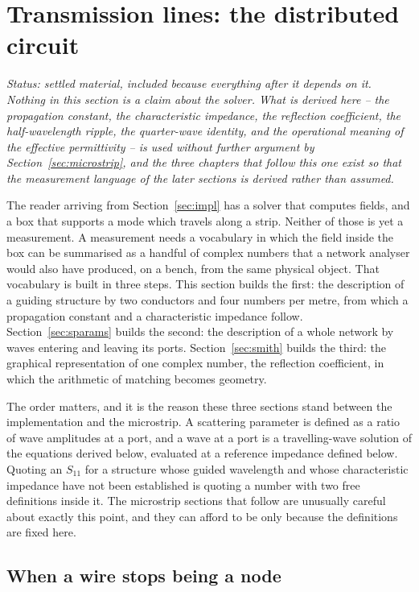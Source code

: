 \section{Transmission lines: the distributed circuit}
\label{sec:tline}

\noindent\emph{Status: settled material, included because everything after it depends on it. Nothing in this
section is a claim about the solver. What is derived here -- the propagation constant, the characteristic
impedance, the reflection coefficient, the half-wavelength ripple, the quarter-wave identity, and the
operational meaning of the effective permittivity -- is used without further argument by
Section~\ref{sec:microstrip}, and the three chapters that follow this one exist so that the measurement
language of the later sections is derived rather than assumed.}

The reader arriving from Section~\ref{sec:impl} has a solver that computes fields, and a box that supports a
mode which travels along a strip. Neither of those is yet a measurement. A measurement needs a vocabulary in
which the field inside the box can be summarised as a handful of complex numbers that a network analyser would
also have produced, on a bench, from the same physical object. That vocabulary is built in three steps. This
section builds the first: the description of a guiding structure by two conductors and four numbers per metre,
from which a propagation constant and a characteristic impedance follow. Section~\ref{sec:sparams} builds the
second: the description of a whole network by waves entering and leaving its ports. Section~\ref{sec:smith}
builds the third: the graphical representation of one complex number, the reflection coefficient, in which the
arithmetic of matching becomes geometry.

The order matters, and it is the reason these three sections stand between the implementation and the
microstrip. A scattering parameter is defined as a ratio of wave amplitudes at a port, and a wave at a port is
a travelling-wave solution of the equations derived below, evaluated at a reference impedance defined below.
Quoting an $S_{11}$ for a structure whose guided wavelength and whose characteristic impedance have not been
established is quoting a number with two free definitions inside it. The microstrip sections that follow are
unusually careful about exactly this point, and they can afford to be only because the definitions are fixed
here.

\subsection{When a wire stops being a node}
\label{sec:tline-lumped}

